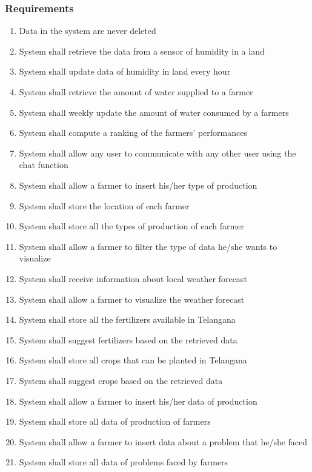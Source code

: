 \subsubsection{Requirements}
\begin{enumerate} [label=\textbf{R.\arabic*}]
    \item Data in the system are never deleted 
    \item System shall retrieve the data from a sensor of humidity in a land
    \item System shall update data of humidity in land every hour
    \item System shall retrieve the amount of water supplied to a farmer
    \item System shall weekly update the amount of water consumed by a farmers 
    \item System shall compute a ranking of the farmers’ performances
    \item System shall allow any user to communicate with any other user using the chat function
    \item System shall allow a farmer to insert his/her type of production
    \item System shall store the location of each farmer
    \item System shall store all the types of production of each farmer
    \item System shall allow a farmer to filter the type of data he/she wants to visualize
    \item System shall receive information about local weather forecast
    \item System shall allow a farmer to visualize the weather forecast
    \item System shall store all the fertilizers available in Telangana
    \item System shall suggest fertilizers based on the retrieved data
    \item System shall store all crops that can be planted in Telangana
    \item System shall suggest crops based on the retrieved data
    \item System shall allow a farmer to insert his/her data of production
    \item System shall store all data of production of farmers
    \item System shall allow a farmer to insert data about a problem that he/she faced 
    \item System shall store all data of problems faced by farmers

\end{enumerate}
